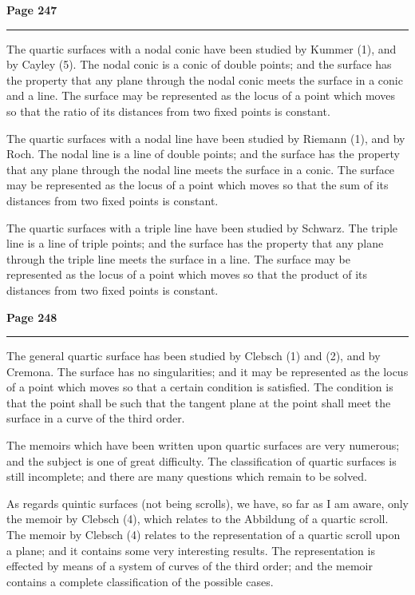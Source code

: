 \documentclass[12pt,a4paper]{article}
\theoremstyle{plain}
\theoremstyle{definition}
\theoremstyle{remark}
\begin{document}
\newpage
\noindent\textbf{Page 247}\\
\noindent\rule{\textwidth}{0.4pt}

\smallskip

\noindent The quartic surfaces with a nodal conic have been studied by Kummer (1), and by Cayley (5). The nodal conic is a conic of double points; and the surface has the property that any plane through the nodal conic meets the surface in a conic and a line. The surface may be represented as the locus of a point which moves so that the ratio of its distances from two fixed points is constant.

\noindent The quartic surfaces with a nodal line have been studied by Riemann (1), and by Roch. The nodal line is a line of double points; and the surface has the property that any plane through the nodal line meets the surface in a conic. The surface may be represented as the locus of a point which moves so that the sum of its distances from two fixed points is constant.

\noindent The quartic surfaces with a triple line have been studied by Schwarz. The triple line is a line of triple points; and the surface has the property that any plane through the triple line meets the surface in a line. The surface may be represented as the locus of a point which moves so that the product of its distances from two fixed points is constant.

\newpage
\noindent\textbf{Page 248}\\
\noindent\rule{\textwidth}{0.4pt}

\smallskip

\noindent The general quartic surface has been studied by Clebsch (1) and (2), and by Cremona. The surface has no singularities; and it may be represented as the locus of a point which moves so that a certain condition is satisfied. The condition is that the point shall be such that the tangent plane at the point shall meet the surface in a curve of the third order.

\noindent The memoirs which have been written upon quartic surfaces are very numerous; and the subject is one of great difficulty. The classification of quartic surfaces is still incomplete; and there are many questions which remain to be solved.

\noindent As regards quintic surfaces (not being scrolls), we have, so far as I am aware, only the memoir by Clebsch (4), which relates to the Abbildung of a quartic scroll. The memoir by Clebsch (4) relates to the representation of a quartic scroll upon a plane; and it contains some very interesting results. The representation is effected by means of a system of curves of the third order; and the memoir contains a complete classification of the possible cases.
\end{document}
